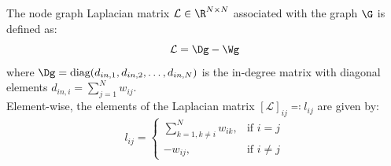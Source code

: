 \begin{definition}\label{def:ch_intro_graphLaplacian}
The node graph Laplacian matrix $\mathcal{L} \in \R^{N \times N}$ associated with the graph $\G$ is defined as:
\begin{equation}\label{eq:laplacian_def}
    \mathcal{L} = \Dg - \Wg
\end{equation}
where $\Dg = \text{diag}(d_{in,1}, d_{in,2}, \dots, d_{in,N})$ is the in-degree matrix with diagonal elements $d_{in,i} = \sum_{j=1}^{N} w_{ij}$.\\
Element-wise, the elements of the Laplacian matrix $[\mathcal{L}]_{ij} \eqqcolon l_{ij}$ are given by:
\begin{equation}\label{eq:ch_intro_laplacianentries}
    l_{ij} = \begin{cases}
        \sum_{k=1, k \neq i}^{N} w_{ik}, & \text{if } i = j \\
        -w_{ij}, & \text{if } i \neq j
    \end{cases}
\end{equation}
\end{definition}
